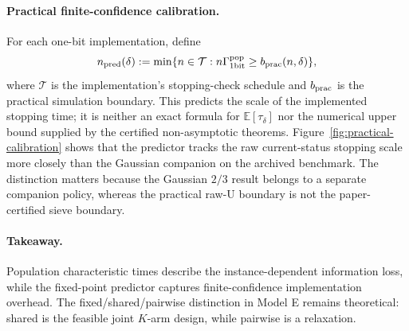 \documentclass[twoside]{article}
\theoremstyle{definition}
\newcommand{\E}{\mathbb E}
\newcommand{\1}{\mathbf 1}
\begin{document}
\paragraph{Practical finite-confidence calibration.}
For each one-bit implementation, define
\begin{equation}
n_{\rm pred}(\delta)
:=\min\{n\in\mathcal T:
 n\Gamma_{\rm 1bit}^{\rm pop}\ge b_{\rm prac}(n,\delta)\},
\label{eq:practical-predictor}
\end{equation}
where $\mathcal T$ is the implementation's stopping-check schedule and
$b_{\rm prac}$ is the practical simulation boundary.  This predicts the scale
of the implemented stopping time; it is neither an exact formula for
$\E[\tau_\delta]$ nor the numerical upper bound supplied by the certified
non-asymptotic theorems.  Figure~\ref{fig:practical-calibration} shows that the
predictor tracks the raw current-status stopping scale more closely than the
Gaussian companion on the archived benchmark.  The distinction matters
because the Gaussian $2/3$ result belongs to a separate companion policy,
whereas the practical raw-U boundary is not the paper-certified sieve
boundary.

\paragraph{Takeaway.}
Population characteristic times describe the instance-dependent information
loss, while the fixed-point predictor captures finite-confidence implementation
overhead.  The fixed/shared/pairwise distinction in Model E remains theoretical:
shared is the feasible joint $K$-arm design, while pairwise is a relaxation.

\end{document}
